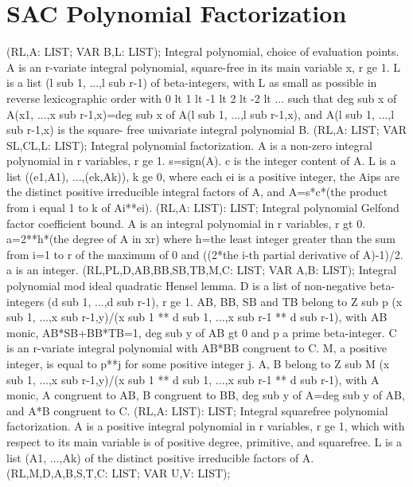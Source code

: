 \section{ SAC Polynomial Factorization  } 
 (RL,A: LIST; VAR B,L: LIST); \eproc
\bcom Integral polynomial, choice of evaluation points. A is an r-variate
integral polynomial, square-free in its main variable x, r ge 1.  L is
a list (l sub 1, ...,l sub r-1) of beta-integers, with L as small as
possible in reverse lexicographic order with 0 lt 1 lt -1 lt 2 lt -2 lt
 ... such that deg sub x of A(x1, ...,x sub r-1,x)=deg sub x of A(l sub
1, ...,l sub r-1,x), and A(l sub 1, ...,l sub r-1,x) is the square-
free univariate integral polynomial B. \ecom 
{} (RL,A: LIST; VAR SL,CL,L: LIST); \eproc
\bcom Integral polynomial factorization. A is a non-zero integral
polynomial in r variables, r ge 1.  s=sign(A).  c is the integer
content of A.  L is a list ((e1,A1), ...,(ek,Ak)), k ge 0, where
each ei is a positive integer, the Aips are the distinct positive
irreducible integral factors of A, and A=s*c*(the product from i
equal 1 to k of Ai**ei). \ecom 
{} (RL,A: LIST): LIST; \eproc
\bcom Integral polynomial Gelfond factor coefficient bound. A is an
integral polynomial in r variables, r gt 0.  a=2**h*(the degree of
A in xr) where h=the least integer greater than the sum from i=1 to
r of the maximum of 0 and ((2*the i-th partial derivative of A)-1)/2.
a is an integer. \ecom 
{} (RL,PL,D,AB,BB,SB,TB,M,C: LIST; VAR A,B: LIST); \eproc
\bcom Integral polynomial mod ideal quadratic Hensel lemma. D is a list of
non-negative beta-integers (d sub 1, ...,d sub r-1), r ge 1.  AB, BB,
SB and TB belong to Z sub p (x sub 1, ...,x sub r-1,y)/(x sub 1 ** d
sub 1, ...,x sub r-1 ** d sub r-1), with AB monic, AB*SB+BB*TB=1,
deg sub y of AB gt 0 and p a prime beta-integer.  C is an r-variate
integral polynomial with AB*BB congruent to C.  M, a positive integer,
is equal to p**j for some positive integer j.  A, B belong to Z sub M
(x sub 1, ...,x sub r-1,y)/(x sub 1 ** d sub 1, ...,x sub r-1 ** d
sub r-1), with A monic, A congruent to AB, B congruent to BB, deg sub y
of A=deg sub y of AB, and A*B congruent to C. \ecom 
{} (RL,A: LIST): LIST; \eproc
\bcom Integral squarefree polynomial factorization. A is a positive
integral polynomial in r variables, r ge 1, which with respect to its
main variable is of positive degree, primitive, and squarefree.  L is a
list (A1, ...,Ak) of the distinct positive irreducible factors of A. \ecom 
{} (RL,M,D,A,B,S,T,C: LIST; VAR U,V: LIST); \eproc
